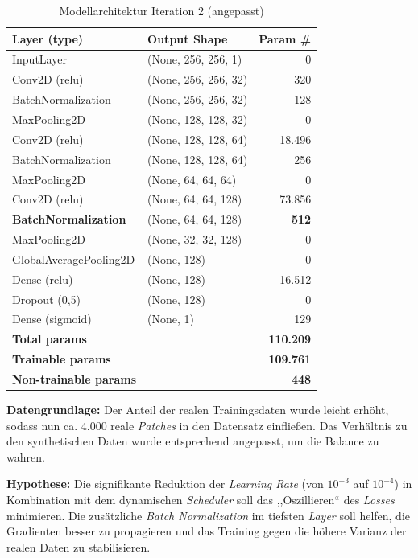 \documentclass[
    a4paper,        %
    11pt,           %
    ngerman,        %
    parskip=half,   %
    listof=totoc,   %
    bibliography=totoc %
]{scrartcl}
\begin{document}
\begin{table}[H]
    \centering
    \caption{Modellarchitektur Iteration 2 (angepasst)}
    \label{tab:model_summary_iter2}
    \begin{tabular}{llr}
        \toprule
        \textbf{Layer (type)} & \textbf{Output Shape} & \textbf{Param \#} \\
        \midrule
        InputLayer & (None, 256, 256, 1) & 0 \\
        Conv2D (relu) & (None, 256, 256, 32) & 320 \\
        BatchNormalization & (None, 256, 256, 32) & 128 \\
        MaxPooling2D & (None, 128, 128, 32) & 0 \\
        Conv2D (relu) & (None, 128, 128, 64) & 18.496 \\
        BatchNormalization & (None, 128, 128, 64) & 256 \\
        MaxPooling2D & (None, 64, 64, 64) & 0 \\
        Conv2D (relu) & (None, 64, 64, 128) & 73.856 \\
        \textbf{BatchNormalization} & (None, 64, 64, 128) & \textbf{512} \\
        MaxPooling2D & (None, 32, 32, 128) & 0 \\
        GlobalAveragePooling2D & (None, 128) & 0 \\
        Dense (relu) & (None, 128) & 16.512 \\
        Dropout (0,5) & (None, 128) & 0 \\
        Dense (sigmoid) & (None, 1) & 129 \\
        \midrule
        \textbf{Total params} & & \textbf{110.209} \\
        \textbf{Trainable params} & & \textbf{109.761} \\
        \textbf{Non-trainable params} & & \textbf{448} \\
        \bottomrule
    \end{tabular}
\end{table}

\textbf{Datengrundlage:}
Der Anteil der realen Trainingsdaten wurde leicht erhöht, sodass nun ca. 4.000 reale \textit{Patches} in den Datensatz einfließen. Das Verhältnis zu den synthetischen Daten wurde entsprechend angepasst, um die Balance zu wahren.

\textbf{Hypothese:}
Die signifikante Reduktion der \textit{Learning Rate} (von $10^{-3}$ auf $10^{-4}$) in Kombination mit dem dynamischen \textit{Scheduler} soll das ,,Oszillieren`` des \textit{Losses} minimieren. Die zusätzliche \textit{Batch Normalization} im tiefsten \textit{Layer} soll helfen, die Gradienten besser zu propagieren und das Training gegen die höhere Varianz der realen Daten zu stabilisieren.
\end{document}
